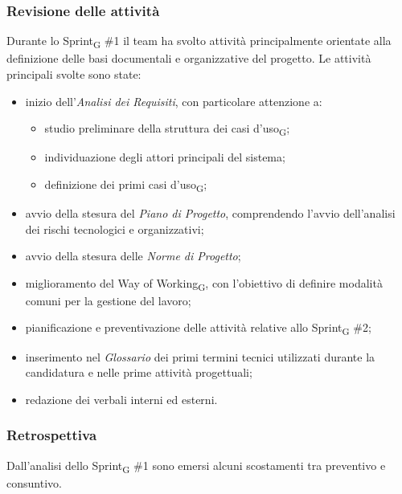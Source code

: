 \documentclass[a4paper, 10pt, colorlinks=true, linkcolor=black, urlcolor=blue, citecolor=blue, hidelinks]{article}
\begin{document}
\subsubsection{Revisione delle attività} 
Durante lo Sprint\textsubscript{G} \#1 il team ha svolto attività principalmente orientate alla definizione delle basi documentali e organizzative del progetto.
Le attività principali svolte sono state:
\begin{itemize}
    \item inizio dell'\textit{Analisi dei Requisiti}, con particolare attenzione a:
    \begin{itemize}
        \item studio preliminare della struttura dei casi d'uso\textsubscript{G};
        \item individuazione degli attori principali del sistema;
        \item definizione dei primi casi d'uso\textsubscript{G}; 
    \end{itemize} 
    \item avvio della stesura del \textit{Piano di Progetto}, comprendendo l'avvio dell'analisi dei rischi tecnologici e organizzativi;
    \item avvio della stesura delle \textit{Norme di Progetto};
    \item miglioramento del Way of Working\textsubscript{G}, con l'obiettivo di definire modalità comuni per la gestione del lavoro;      
    \item pianificazione e preventivazione delle attività relative allo Sprint\textsubscript{G} \#2;
    \item inserimento nel \textit{Glossario} dei primi termini tecnici utilizzati durante la candidatura e nelle prime attività progettuali;
    \item redazione dei verbali interni ed esterni.
\end{itemize}

\subsubsection{Retrospettiva}
Dall'analisi dello Sprint\textsubscript{G} \#1 sono emersi alcuni scostamenti tra preventivo e consuntivo.
\end{document}
